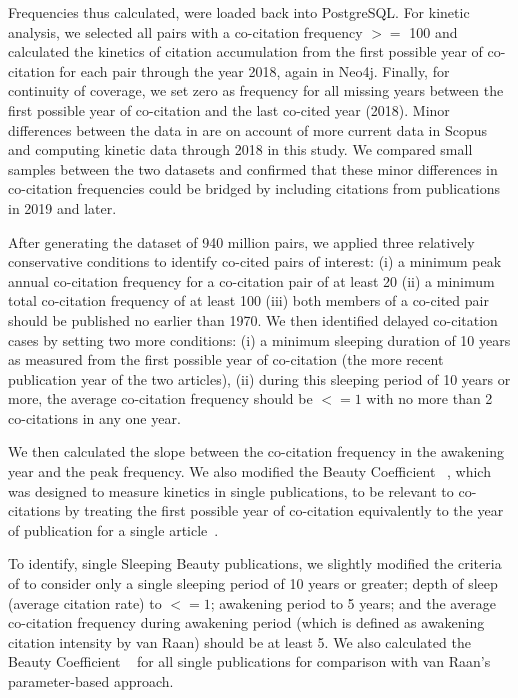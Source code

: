 \documentclass[utf8]{frontiersSCNS}
\begin{document}
Frequencies thus calculated, were loaded back into PostgreSQL. For kinetic analysis, we selected all pairs with a co-citation frequency $>=$ 100 and calculated the kinetics of citation accumulation from the first possible year of co-citation for each pair through the year 2018, again in Neo4j.  Finally, for continuity of coverage, we set zero as frequency for all missing years between the first possible year of co-citation and the last co-cited year (2018). Minor differences between the data in  \cite{devarakonda_2020} are on account of more current data in Scopus and computing kinetic data through 2018 in this study. We compared small samples between the two datasets and confirmed that these minor differences in co-citation frequencies could be bridged by including citations from publications in 2019 and later. 

After generating the dataset of 940 million pairs, we applied three relatively conservative conditions to identify co-cited pairs of interest: (i) a minimum peak annual co-citation frequency for a co-citation pair of at least 20 (ii) a minimum total co-citation frequency of at least 100 (iii) both members of a co-cited pair should be published no earlier than 1970. We then identified delayed co-citation cases by setting two more conditions: (i) a minimum sleeping duration of 10 years as measured from the first possible year of co-citation (the more recent publication year of the two articles), (ii) during this sleeping period of 10 years or more, the average co-citation frequency should be $<= 1$ with no more than 2 co-citations in any one year. 

We then calculated the slope between the co-citation frequency in the awakening year and the peak frequency. We also modified the Beauty Coefficient ~\citep{Ke2015}, which was designed to measure kinetics in single publications, to be relevant to co-citations by treating the first possible year of co-citation equivalently to the year of publication for a single article~\citep{devarakonda_2020}. 

To identify, single Sleeping Beauty publications, we slightly modified the criteria of \cite{Raan2019} to consider only a single sleeping period of 10 years or greater; depth of sleep (average citation rate) to $<= 1$; awakening period to 5 years; and the average co-citation frequency during awakening period (which is defined as awakening citation intensity by van Raan) should be at least 5. We also calculated the Beauty Coefficient ~\citep{Ke2015} for all single publications for comparison with van Raan's parameter-based approach.
\end{document}

